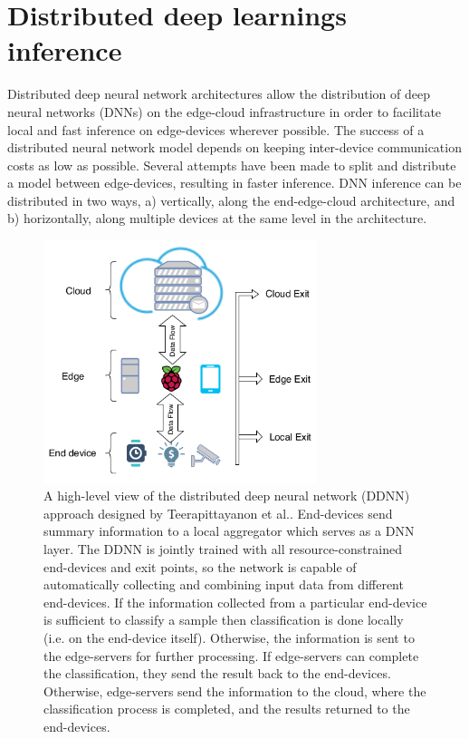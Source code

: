 \documentclass[letterpaper, 10 pt, conference]{ieeeconf}
\begin{document}
\section{Distributed deep learnings inference}
Distributed deep neural network architectures allow the distribution of deep neural networks (DNNs) on the edge-cloud infrastructure in order to facilitate local and fast inference on edge-devices wherever possible. The success of a distributed neural network model depends on keeping inter-device communication costs as low as possible. Several attempts have been made to split and distribute a model between edge-devices, resulting in faster inference. DNN inference can be distributed in two ways, a) vertically, along the end-edge-cloud architecture, and b) horizontally, along multiple devices at the same level in the architecture.
\begin{figure}[bh] 
	\centerline{\includegraphics[width=8cm]{DDNN-Tee.png}}
	\vspace*{8pt}
	\caption{A high-level view of the distributed deep neural network (DDNN) approach designed by Teerapittayanon et al.\cite{Teerapittayanon_McDanel_Kung_2017}. End-devices send summary information to a local aggregator which serves as a DNN layer. The DDNN is jointly trained with all resource-constrained end-devices and exit points, so the network is capable of automatically collecting and combining input data from different end-devices. If the information collected from a particular end-device is sufficient to classify a sample then classification is done locally (i.e. on the end-device itself). Otherwise, the information is sent to the edge-servers for further processing. If edge-servers can complete the classification, they send the result back to the end-devices. Otherwise, edge-servers send the information to the cloud, where the classification process is completed, and the results returned to the end-devices.}
\end{figure}
\end{document}
